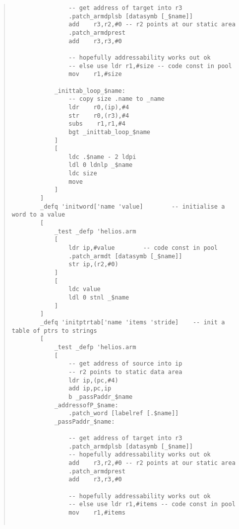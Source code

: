 \begin {quote}
\begin{verbatim}
                -- get address of target into r3
                .patch_armdplsb [datasymb [_$name]]
                add    r3,r2,#0 -- r2 points at our static area
                .patch_armdprest
                add    r3,r3,#0

                -- hopefully addressability works out ok
                -- else use ldr r1,#size -- code const in pool
                mov    r1,#size

            _inittab_loop_$name:
                -- copy size .name to _name
                ldr    r0,(ip),#4
                str    r0,(r3),#4
                subs    r1,r1,#4
                bgt _inittab_loop_$name
            ]
            [
                ldc .$name - 2 ldpi
                ldl 0 ldnlp _$name
                ldc size
                move
            ]
        ]
        _defq 'initword['name 'value]        -- initialise a word to a value
        [
            _test _defp 'helios.arm
            [
                ldr ip,#value        -- code const in pool
                .patch_armdt [datasymb [_$name]]
                str ip,(r2,#0)
            ]
            [
                ldc value
                ldl 0 stnl _$name
            ]
        ]
        _defq 'initptrtab['name 'items 'stride]    -- init a table of ptrs to strings
        [
            _test _defp 'helios.arm
            [
                -- get address of source into ip
                -- r2 points to static data area
                ldr ip,(pc,#4)
                add ip,pc,ip
                b _passPaddr_$name
            _addressofP_$name:
                .patch_word [labelref [.$name]]
            _passPaddr_$name:

                -- get address of target into r3
                .patch_armdplsb [datasymb [_$name]]
                -- hopefully addressability works out ok
                add    r3,r2,#0 -- r2 points at our static area
                .patch_armdprest
                add    r3,r3,#0

                -- hopefully addressability works out ok
                -- else use ldr r1,#items -- code const in pool
                mov    r1,#items


\end{verbatim}
\end{quote}
